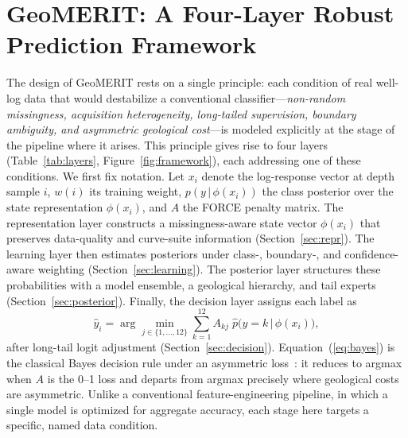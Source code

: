 \documentclass[bdcc,article,submit,pdftex,moreauthors]{Definitions/mdpi}
\begin{document}
\section{GeoMERIT: A Four-Layer Robust Prediction Framework}
\label{sec:method}
The design of GeoMERIT rests on a single principle: each condition of real well-log data that
would destabilize a conventional classifier---\emph{non-random missingness, acquisition
heterogeneity, long-tailed supervision, boundary ambiguity, and asymmetric geological
cost}---is modeled explicitly at the stage of the pipeline where it arises. This principle
gives rise to four layers (Table~\ref{tab:layers}, Figure~\ref{fig:framework}), each
addressing one of these conditions. We first fix notation. Let $x_i$ denote the log-response
vector at depth sample $i$, $w(i)$ its training weight, $p(y\,|\,\phi(x_i))$ the class
posterior over the state representation $\phi(x_i)$, and $A$ the FORCE penalty matrix. The
representation layer constructs a missingness-aware state vector $\phi(x_i)$ that preserves
data-quality and curve-suite information (Section~\ref{sec:repr}). The learning layer then
estimates posteriors under class-, boundary-, and confidence-aware weighting
(Section~\ref{sec:learning}). The posterior layer structures these probabilities with a model
ensemble, a geological hierarchy, and tail experts (Section~\ref{sec:posterior}). Finally, the
decision layer assigns each label as
\begin{equation}
\hat y_i = \arg\min_{j\in\{1,\ldots,12\}} \sum_{k=1}^{12} A_{kj}\;\hat p\!\bigl(y=k\,\big|\,\phi(x_i)\bigr),
\label{eq:bayes}
\end{equation}
after long-tail logit adjustment (Section~\ref{sec:decision}). Equation~(\ref{eq:bayes}) is the
classical Bayes decision rule under an asymmetric loss~\cite{berger1985decision}: it reduces to
argmax when $A$ is the 0--1 loss and departs from argmax precisely where geological costs are
asymmetric. Unlike a conventional feature-engineering pipeline, in which a single model is
optimized for aggregate accuracy, each stage here targets a specific, named data condition.
\end{document}
